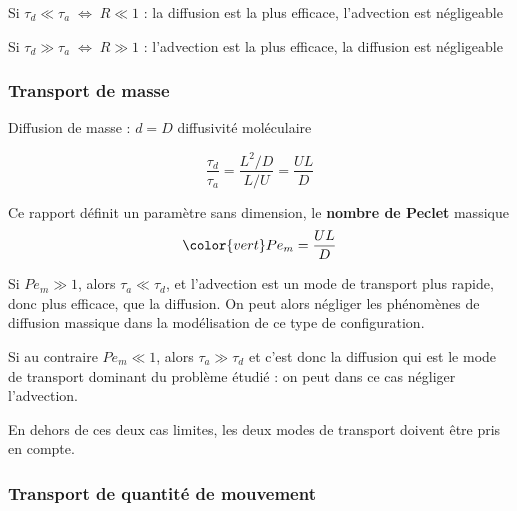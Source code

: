 {\begin{frame}{\insertsubsubsectionhead}
	  
\medskip
	\qquad \color{rouge} Si $\tau_d \ll \tau_a \; \Leftrightarrow \; R \ll 1$ : 
	la diffusion est la plus efficace, l'advection est négligeable

\smallskip
	\qquad \color{vert} Si $\tau_d \gg \tau_a \; \Leftrightarrow \; R \gg 1$ : 
	l'advection est la plus efficace, la diffusion est négligeable

\end{frame}

\subsubsection{Transport de masse}

\begin{frame}{\insertsubsubsectionhead}

\small

Diffusion de masse : $d=D$ diffusivité moléculaire

\[
	\frac{\tau_d}{\tau_a} = \frac{L^2/D}{L/U} = \frac{UL}{D}
\]

\medskip

Ce rapport définit un paramètre sans dimension, le \textbf{nombre de Peclet} massique 
$$\color{vert}Pe_m = \frac{UL}{D}$$

\smallskip

Si $Pe_m\gg1$, alors $\tau_a\ll\tau_d$, et l'advection
est un mode de transport plus rapide, donc plus efficace, que la diffusion.
On peut alors négliger les phénomènes de diffusion massique dans la modélisation de ce type de configuration.

\smallskip

Si au contraire $Pe_m\ll1$, alors $\tau_a\gg\tau_d$ et c'est donc la diffusion qui est le mode de transport
dominant du problème étudié : on peut dans ce cas négliger l'advection.

\smallskip

En dehors de ces deux cas limites, les deux modes de transport doivent être pris en compte.

\vspace{22mm}

\end{frame}

\subsubsection{Transport de quantité de mouvement}

}
